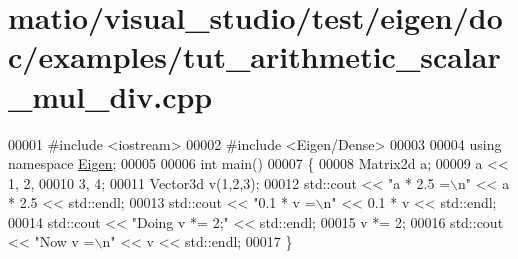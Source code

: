 \hypertarget{matio_2visual__studio_2test_2eigen_2doc_2examples_2tut__arithmetic__scalar__mul__div_8cpp_source}{}\section{matio/visual\+\_\+studio/test/eigen/doc/examples/tut\+\_\+arithmetic\+\_\+scalar\+\_\+mul\+\_\+div.cpp}
\label{matio_2visual__studio_2test_2eigen_2doc_2examples_2tut__arithmetic__scalar__mul__div_8cpp_source}

\begin{DoxyCode}
00001 \textcolor{preprocessor}{#include <iostream>}
00002 \textcolor{preprocessor}{#include <Eigen/Dense>}
00003 
00004 \textcolor{keyword}{using namespace }\hyperlink{namespace_eigen}{Eigen};
00005 
00006 \textcolor{keywordtype}{int} main()
00007 \{
00008   Matrix2d a;
00009   a << 1, 2,
00010        3, 4;
00011   Vector3d v(1,2,3);
00012   std::cout << \textcolor{stringliteral}{"a * 2.5 =\(\backslash\)n"} << a * 2.5 << std::endl;
00013   std::cout << \textcolor{stringliteral}{"0.1 * v =\(\backslash\)n"} << 0.1 * v << std::endl;
00014   std::cout << \textcolor{stringliteral}{"Doing v *= 2;"} << std::endl;
00015   v *= 2;
00016   std::cout << \textcolor{stringliteral}{"Now v =\(\backslash\)n"} << v << std::endl;
00017 \}
\end{DoxyCode}
